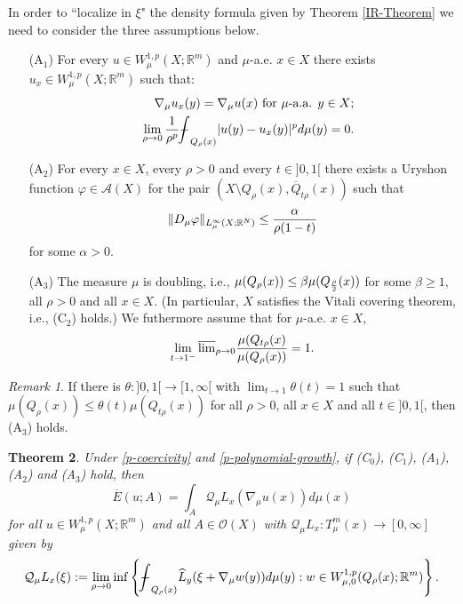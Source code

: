\documentclass[10pt]{amsart}
\numberwithin{equation}{section}
\newtheorem{theorem}{Theorem}[section]
\theoremstyle{definition}
\theoremstyle{remark}
\newtheorem{remark}[theorem]{Remark}
\begin{document}
In order to ``localize in $\xi$" the density formula given by Theorem \ref{IR-Theorem} we need to consider the three assumptions below.
\begin{itemize}
\item[(A$_1$)] For every $u\in W^{1,p}_\mu(X;{{\mathbb R}}^m)$ and $\mu$-a.e. $x\in X$ there exists $u_x\in W^{1,p}_\mu(X;{{\mathbb R}}^m)$ such that:
\begin{eqnarray}
&&\nabla_\mu u_x(y)=\nabla_\mu u(x)\hbox{ for $\mu$-a.a. $y\in X$};\label{FinALAssuMpTIOnOne}\\
&&\lim_{\rho\to0}{1\over\rho^p}{{{\bf-}\!\!\!\!\!\!\hspace{-.1em}\int}}_{Q_\rho(x)}|u(y)-u_x(y)|^pd\mu(y)=0.\label{FinALAssuMpTIOnTwo}
\end{eqnarray}
\item[(A$_2$)] For every $x\in X$, every $\rho>0$ and every $t\in]0,1[$ there exists a Uryshon function $\varphi\in\mathcal{A}(X)$ for the pair $(X\setminus Q_\rho(x),\overline{Q}_{t\rho}(x))$ such that 
$$
\|D_\mu\varphi\|_{L^\infty_\mu(X;{{\mathbb R}}^N)}\leq{\alpha\over\rho(1-t)}
$$
for some $\alpha>0$.
\item[(A$_3$)] The measure $\mu$ is doubling, i.e., ${\mu(Q_\rho(x))\leq\beta\mu(Q_{\rho\over 2}(x))}$ for some $\beta\geq 1$, all $\rho>0$ and all $x\in X$. (In particular, $X$ satisfies the Vitali covering theorem, i.e., (C$_2$) holds.) We futhermore assume that for $\mu$-a.e. $x\in X$,
\begin{equation}\label{DoublINgAssUMpTiON}
\lim_{t\to 1^-}{\mathop{\overline{\lim}}}_{\rho\to0}{\mu(Q_{t\rho}(x)\over\mu(Q_\rho(x))}=1.
\end{equation}
\end{itemize} 

\begin{remark}
If there is $\theta:]0,1[\to[1,\infty[$ with $\lim_{t\to 1}\theta(t)=1$ such that 
$
\mu(Q_\rho(x))\leq\theta(t)\mu(Q_{t\rho}(x))
$
for all $\rho>0$, all $x\in X$ and all $t\in]0,1[$, then (A$_3$) holds.
\end{remark}

\begin{theorem}\label{FiNaL-Main-TheOrEM}
Under \eqref{p-coercivity} and \eqref{p-polynomial-growth}, if {\rm (C$_0$)}, {\rm (C$_1$)}, {\rm (A$_1$)}, {\rm (A$_2$)} and {\rm (A$_3$)} hold, then 
$$
\overline{E}(u;A)=\int_A \mathcal{Q}_\mu L_x(\nabla_\mu u(x))d\mu(x) 
$$
for all $u\in W^{1,p}_\mu(X;{{\mathbb R}}^m)$ and all $A\in\mathcal{O}(X)$ with $\mathcal{Q}_\mu L_x:T_\mu^m(x)\to[0,\infty]$ given by
$$
\mathcal{Q}_\mu L_x(\xi):=\lim_{\rho\to 0}\inf\left\{{{{\bf-}\!\!\!\!\!\!\hspace{-.1em}\int}}_{Q_\rho(x)}\widehat{L}_y(\xi+\nabla_\mu w(y))d\mu(y):w\in W^{1,p}_{\mu,0}(Q_\rho(x);{{\mathbb R}}^m)\right\}.
$$
\end{theorem}
\end{document}

